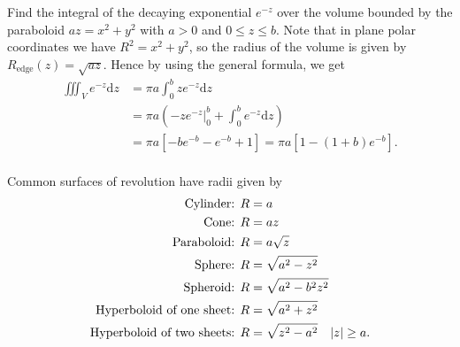 \documentclass[../multivariate_calculus.tex]{subfiles}
\begin{document}
        \begin{example}
            Find the integral of the decaying exponential $e^{-z}$ over the volume bounded by the paraboloid $az=x^2+y^2$ with $a>0$ and $0\leq z\leq b$.
            Note that in plane polar coordinates we have $R^2=x^2+y^2$, so the radius of the volume is given by $R_\text{edge}(z)=\sqrt{az}$.
            Hence by using the general formula, we get
            \begin{align}
                \iiint_V e^{-z}\mathrm{d}z&=\pi a\int_0^b ze^{-z}\mathrm{d}z\\
                &=\pi a\left(\left.-ze^{-z}\right|_0^b+\int_0^b e^{-z}\mathrm{d}z\right)\\
                &=\pi a\left[-be^{-b}-e^{-b}+1\right]=\pi a[1-(1+b)e^{-b}].
            \end{align}
        \end{example}
        
        \paragraph{}
        Common surfaces of revolution have radii given by
        \begin{align}
            \text{Cylinder: }&R=a\\
            \text{Cone: }&R=az\\
            \text{Paraboloid: }&R=a\sqrt{z}\\
            \text{Sphere: }&R=\sqrt{a^2-z^2}\\
            \text{Spheroid: }&R=\sqrt{a^2-b^2z^2}\\
            \text{Hyperboloid of one sheet: }&R=\sqrt{a^2+z^2}\\
            \text{Hyperboloid of two sheets: }&R=\sqrt{z^2-a^2}\quad\lvert z\rvert\geq a.
        \end{align}
\end{document}
